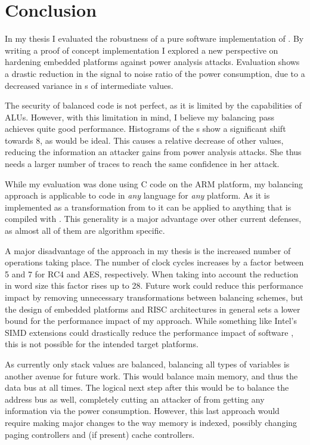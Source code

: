 \section{Conclusion}
\label{conclusion}
In my thesis I evaluated the robustness of a pure software implementation of \dual{}.
By writing a proof of concept implementation I explored a new perspective on hardening embedded platforms against power analysis attacks.
Evaluation shows a drastic reduction in the signal to noise ratio of the power consumption, due to a decreased variance in \hammingw{}s of intermediate values.

The security of balanced code is not perfect, as it is limited by the capabilities of ALUs.
However, with this limitation in mind, I believe my balancing pass achieves quite good performance.
Histograms of the \hammingw{}s show a significant shift towards 8, as would be ideal.
This causes a relative decrease of other values, reducing the information an attacker gains from power analysis attacks.
She thus needs a larger number of traces to reach the same confidence in her attack.

While my evaluation was done using C code on the ARM platform, my balancing approach is applicable to code in \emph{any} language for \emph{any} platform.
As it is implemented as a transformation from \ir{} to \ir{} it can be applied to anything that is compiled with \llvm{}.
This generality is a major advantage over other current \poweranalysis{} defenses, as almost all of them are algorithm specific.

A major disadvantage of the approach in my thesis is the increased number of operations taking place.
The number of clock cycles increases by a factor between 5 and 7 for RC4 and AES, respectively.
When taking into account the reduction in word size this factor rises up to 28.
Future work could reduce this performance impact by removing unnecessary transformations between balancing schemes, but the design of embedded platforms and RISC architectures in general sets a lower bound for the performance impact of my approach.
While something like Intel's SIMD extensions\cite{lomont2011introduction} could drastically reduce the performance impact of software \dual{}, this is not possible for the intended target platforms.

As currently only stack values are balanced, balancing all types of variables is another avenue for future work.
This would balance main memory, and thus the data bus at all times.
The logical next step after this would be to balance the address bus as well, completely cutting an attacker of from getting any information via the power consumption.
However, this last approach would require making major changes to the way memory is indexed, possibly changing paging controllers and (if present) cache controllers.

